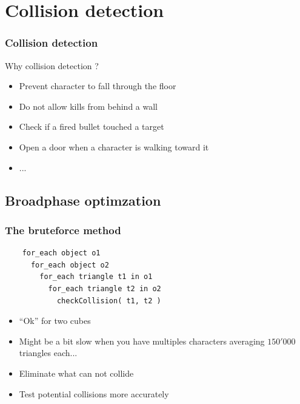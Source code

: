 \documentclass{beamer}
\begin{document}
\section{Collision detection}
\begin{frame}
  \frametitle{Collision detection}
  
  \begin{block}{Why collision detection ?}
    \begin{itemize}
    \item Prevent character to fall through the floor
    \item Do not allow kills from behind a wall
    \item Check if a fired bullet touched a target
    \item Open a door when a character is walking toward it
    \item ...
    \end{itemize}
  \end{block}
  
\end{frame}
\subsection{Broadphase optimzation}

\begin{frame}[fragile]
  \frametitle{The bruteforce method}

  \begin{lstlisting}
    for_each object o1
      for_each object o2
        for_each triangle t1 in o1
          for_each triangle t2 in o2
            checkCollision( t1, t2 )
  \end{lstlisting}

  \pause
  \begin{itemize}
  \item ``Ok'' for two cubes
  \item Might be a bit slow when you have multiples characters averaging $150'000$ triangles each...
    \pause
  \item Eliminate what can not collide
  \item Test potential collisions more accurately
  \end{itemize}
  
\end{frame}
\end{document}
